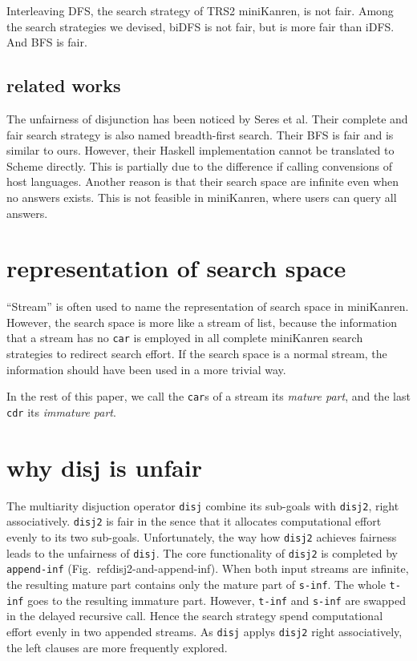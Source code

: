 \documentclass[format=acmlarge, review=true, authordraft=true]{acmart}
\begin{document}
Interleaving DFS, the search strategy of TRS2 miniKanren, is not fair. Among 
the search strategies we devised, biDFS is not fair, but is more fair than 
iDFS. And BFS is fair.

\subsection{related works}

The unfairness of disjunction has been noticed by Seres et al. Their complete 
and fair search strategy is also named breadth-first search. Their BFS 
is fair and is similar to ours. However, their Haskell implementation cannot be 
translated to Scheme directly. This is partially due to the difference if 
calling convensions of host languages. Another reason is that their search 
space are infinite even when no answers exists. This is not feasible 
in miniKanren, where users can query all answers. 


\section{representation of search space}

``Stream'' is often used to name the representation of search space in 
miniKanren. However, the search space is more like a stream of list, 
because the information that a stream has no \texttt{car} is employed in all 
complete miniKanren search strategies to redirect search effort. If the search 
space is a normal stream, the information should have been used in a more 
trivial way. 

In the rest of this paper, we call the \texttt{car}s of a stream 
its \textit{mature part}, and the last \texttt{cdr} its \textit{immature part}.

\section{why disj is unfair}

The multiarity disjuction operator \texttt{disj} combine its sub-goals with 
\texttt{disj2}, right associatively. \texttt{disj2} is fair in the sence that 
it allocates computational effort evenly to its two sub-goals. Unfortunately, 
the way how \texttt{disj2} achieves fairness leads to the unfairness of 
\texttt{disj}. The core functionality of \texttt{disj2} is completed by 
\texttt{append-inf} (Fig.~ref{disj2-and-append-inf}). When both input streams 
are infinite, the resulting mature part contains only the mature part of 
\texttt{s-inf}. The whole \texttt{t-inf} goes to the resulting immature part. 
However, \texttt{t-inf} and \texttt{s-inf} are swapped in the delayed recursive 
call. Hence the search strategy spend computational effort evenly in two 
appended streams. As \texttt{disj} applys \texttt{disj2} right associatively, 
the left clauses are more frequently explored.
\end{document}
